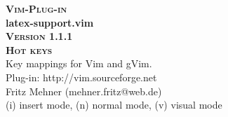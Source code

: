 \documentclass[oneside,10pt,landscape,DIV16]{scrartcl}
\newcommand{\Pluginversion}{1.1.1}
\begin{document}
\begin{multicols}{3}
\begin{center}
%
\textbf{\textsc{\small{Vim-Plug-in}}}\\
\textbf{\LARGE{latex-support.vim}}\\
\textbf{\textsc{\small{Version \Pluginversion}}}\\
\vspace{5mm}%
\textbf{\textsc{\Huge{Hot keys}}}\\
\vspace{5mm}%
Key mappings for Vim and gVim.\\
Plug-in: http://vim.sourceforge.net\\
Fritz Mehner (mehner.fritz@web.de)\\
\vspace{1.0mm}
{\normalsize (i)} insert mode, {\normalsize (n)} normal mode, {\normalsize (v)} visual mode\\
\vspace{4.0mm}


\end{center}
\end{multicols}
\end{document}
